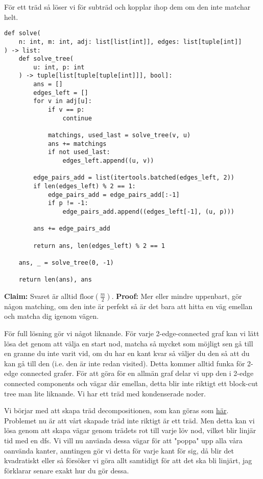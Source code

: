 \documentclass[a4paper, 12pt]{article}
\newenvironment{problem}[2][Problem]{\begin{trivlist}
\item[\hskip \labelsep {\bfseries #1}\hskip \labelsep {\bfseries #2.}]}{\end{trivlist}}
\begin{document}
\newpage

\begin{problem}{3}
    För ett träd så löser vi för subträd och kopplar ihop dem om den inte matchar helt.
    \begin{verbatim}
def solve(
    n: int, m: int, adj: list[list[int]], edges: list[tuple[int]]
) -> list:
    def solve_tree(
        u: int, p: int
    ) -> tuple[list[tuple[tuple[int]]], bool]:
        ans = []
        edges_left = []
        for v in adj[u]:
            if v == p:
                continue

            matchings, used_last = solve_tree(v, u)
            ans += matchings
            if not used_last:
                edges_left.append((u, v))

        edge_pairs_add = list(itertools.batched(edges_left, 2))
        if len(edges_left) % 2 == 1:
            edge_pairs_add = edge_pairs_add[:-1]
            if p != -1:
                edge_pairs_add.append((edges_left[-1], (u, p)))

        ans += edge_pairs_add

        return ans, len(edges_left) % 2 == 1

    ans, _ = solve_tree(0, -1)

    return len(ans), ans

    \end{verbatim}

    \textbf{Claim: } Svaret är alltid $\text{floor}(\frac{m}{2})$.
    \textbf{Proof: } Mer eller mindre uppenbart, gör någon matching, om den inte är perfekt så är det bara att hitta en väg emellan och matcha dig igenom vägen.
    

    För full lösning gör vi något liknande. För varje 2-edge-connected graf kan vi lätt lösa det genom att välja en start nod, matcha så mycket som möjligt sen gå till en granne du inte varit vid, om du har en kant kvar så väljer du den så att du kan gå till den (i.e. den är inte redan visited). Detta kommer alltid funka för 2-edge connected grafer. För att göra för en allmän graf delar vi upp den i 2-edge connected components och vägar där emellan, detta blir inte riktigt ett block-cut tree man lite liknande. Vi har ett träd med kondenserade noder.

    Vi börjar med att skapa träd decompositionen, som kan göras som \href{https://codeforces.com/blog/entry/83980}{här}. Problemet nu är att vårt skapade träd inte riktigt är ett träd. Men detta kan vi lösa genom att skapa vägar genom trädets rot till varje löv nod, vilket blir linjär tid med en dfs. Vi vill nu använda dessa vägar för att "poppa" upp alla våra oanvända kanter, anntingen gör vi detta för varje kant för   sig, då blir det kvadratiskt eller så försöker vi göra allt samtidigt för att det ska bli linjärt, jag förklarar senare exakt hur du gör dessa.



\end{problem}
\end{document}
